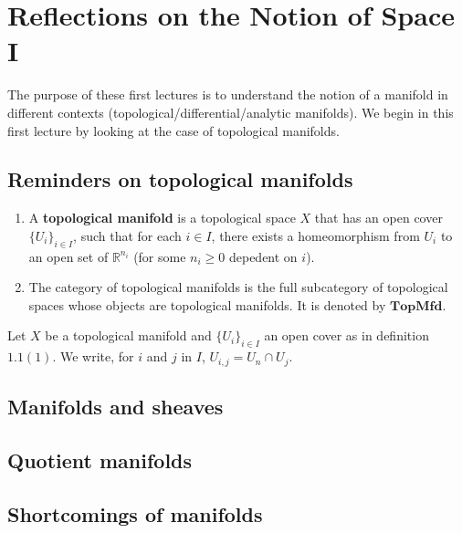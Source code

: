 \setcounter{chapter}{0}
\chapter{Reflections on the Notion of Space I}

The purpose of these first lectures is to understand the notion of a manifold in different contexts (topological/differential/analytic manifolds). We begin in this first lecture by looking at the case of topological manifolds.

\section{Reminders on topological manifolds}

\begin{defn}


\begin{enumerate}
    \item A \textbf{topological manifold} is a topological space $X$ that has an open cover $\{U_i\}_{i \in I}$, such that for each $i \in I$, there exists a homeomorphism from $U_i$ to an open set of $\mathbb R^{n_i}$ (for some $n_i\ge 0$ depedent on $i$).
    \item The category of topological manifolds is the full subcategory of topological spaces whose objects are topological manifolds. It is denoted by $\mathbf{TopMfd}$.
\end{enumerate}

\end{defn}

Let $X$ be a topological manifold and $\{U_i\}_{i \in I}$ an open cover as in definition $1.1 (1)$. We write, for $i$ and $j$ in $I$, $U_{i,j} = U_n \cap U_j$.

\section{Manifolds and sheaves}

\section{Quotient manifolds}

\section{Shortcomings of manifolds}
